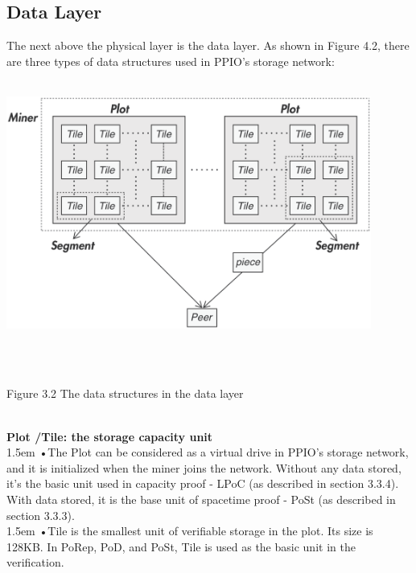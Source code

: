 \documentclass[10pt,a4paper]{article}
\begin{document}
        \subsection{Data Layer}  %
The next above the physical layer is the data layer. As shown in Figure 4.2, there are three types of data structures used in PPIO’s storage network:
\vspace{-1em}
\\\\
\centerline{\includegraphics[width=340pt]{fig12}}
\\\\ \centerline{{Figure 3.2 The data structures in the data layer}}
\vspace{-1.5em}
\\

\noindent   
{\bf Plot /Tile: the storage capacity unit}
\vspace{-0.8em}
\\

\hangindent 1.5em
\noindent   
•\quad The Plot can be considered as a virtual drive in PPIO’s storage network, and it is initialized when the miner joins the network. Without any data stored, it's the basic unit used in capacity proof - LPoC (as described in section 3.3.4). With data stored, it is the base unit of spacetime proof - PoSt (as described in section 3.3.3).
\vspace{-0.8em}
\\

\hangindent 1.5em
\noindent   
•\quad Tile is the smallest unit of verifiable storage in the plot. Its size is 128KB. In PoRep, PoD, and PoSt, Tile is used as the basic unit in the verification.
\vspace{-0.5em}
\\
\end{document}
